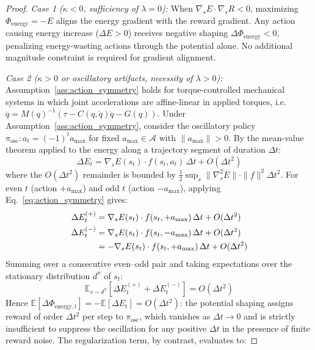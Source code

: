 \documentclass[journal]{IEEEtran}
\begin{document}
	\begin{proof}
		\textit{Case 1 ($\kappa < 0$, sufficiency of $\lambda=0$):} When $\nabla_s E \cdot \nabla_s R < 0$, maximizing $\Phi_{\text{energy}} = -E$ aligns the energy gradient with the reward gradient. Any action causing energy increase ($\Delta E > 0$) receives negative shaping $\Delta\Phi_{\text{energy}} < 0$, penalizing energy-wasting actions through the potential alone. No additional magnitude constraint is required for gradient alignment.
		
		\textit{Case 2 ($\kappa > 0$ or oscillatory artifacts, necessity of $\lambda > 0$):} Assumption~\ref{ass:action_symmetry} holds for torque-controlled mechanical systems in which joint accelerations are affine-linear in applied torques, i.e.\ $\ddot{q} = M(q)^{-1}(\tau - C(q,\dot{q})\dot{q} - G(q))$. Under Assumption~\ref{ass:action_symmetry}, consider the oscillatory policy $\pi_{\text{osc}}: a_t = (-1)^t a_{\max}$ for fixed $a_{\max}\in\mathcal{A}$ with $\|a_{\max}\|>0$. By the mean-value theorem applied to the energy along a trajectory segment of duration $\Delta t$:
		\begin{equation}
			\Delta E_t = \nabla_s E(s_t) \cdot f(s_t, a_t)\,\Delta t + O(\Delta t^2)
			\label{eq:energy_step}
		\end{equation}
		where the $O(\Delta t^2)$ remainder is bounded by $\tfrac{1}{2}\sup_s\|\nabla^2_s E\|\cdot\|f\|^2\Delta t^2$. For even $t$ (action $+a_{\max}$) and odd $t$ (action $-a_{\max}$), applying Eq.~\eqref{eq:action_symmetry} gives:
		\begin{align}
			\Delta E_t^{(+)} &= \nabla_s E(s_t)\cdot f(s_t,+a_{\max})\,\Delta t + O(\Delta t^2) \\
			\Delta E_t^{(-)} &= \nabla_s E(s_t)\cdot f(s_t,-a_{\max})\,\Delta t + O(\Delta t^2) \notag\\
			&= -\nabla_s E(s_t)\cdot f(s_t,+a_{\max})\,\Delta t + O(\Delta t^2)
		\end{align}
		Summing over a consecutive even--odd pair and taking expectations over the stationary distribution $d^\pi$ of $s_t$:
		\begin{equation}
			\mathbb{E}_{s\sim d^\pi}\!\left[\Delta E_t^{(+)} + \Delta E_t^{(-)}\right] = O(\Delta t^2)
			\label{eq:energy_cancellation}
		\end{equation}
		Hence $\mathbb{E}[\Delta\Phi_{\text{energy},t}] = -\mathbb{E}[\Delta E_t] = O(\Delta t^2)$: the potential shaping assigns reward of order $\Delta t^2$ per step to $\pi_{\text{osc}}$, which vanishes as $\Delta t\to 0$ and is strictly insufficient to suppress the oscillation for any positive $\Delta t$ in the presence of finite reward noise. The regularization term, by contrast, evaluates to:

\end{proof}
\end{document}
